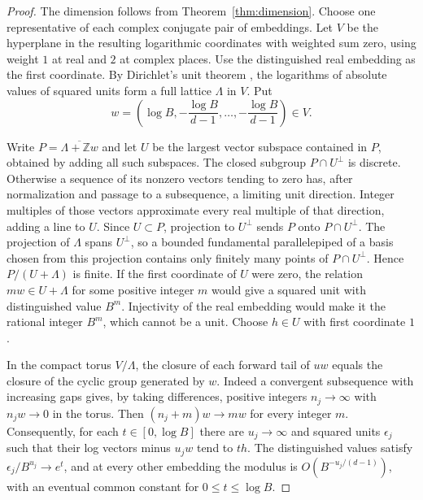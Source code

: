 \documentclass[11pt,reqno,a4paper]{amsart}
\theoremstyle{remark}
\begin{document}
\begin{proof}
The dimension follows from Theorem~\ref{thm:dimension}. Choose
one representative of each complex conjugate pair of embeddings.
Let \(V\) be the hyperplane in the resulting logarithmic
coordinates with weighted sum zero, using weight \(1\) at real
and \(2\) at complex places. Use the distinguished real embedding
as the first coordinate. By Dirichlet's unit theorem
\cite[Chapter~I, \S7]{met-neukirch}, the logarithms of absolute
values of squared units form a full lattice \(\Lambda\) in \(V\).
Put
\[
 w=\left(\log B,-\frac{\log B}{d-1},\ldots,
                  -\frac{\log B}{d-1}\right)\in V.
\]

Write \(P=\overline{\Lambda+\mathbb Zw}\) and let \(U\) be the
largest vector subspace contained in \(P\), obtained by adding all
such subspaces. The closed subgroup \(P\cap U^\perp\) is discrete.
Otherwise a sequence of its nonzero vectors tending to zero has,
after normalization and passage to a subsequence, a limiting unit
direction. Integer multiples of those vectors approximate every
real multiple of that direction, adding a line to \(U\). Since
\(U\subset P\), projection to \(U^\perp\) sends \(P\) onto
\(P\cap U^\perp\). The projection of \(\Lambda\) spans \(U^\perp\),
so a bounded fundamental parallelepiped of a basis chosen from
this projection contains only finitely many points of
\(P\cap U^\perp\). Hence \(P/(U+\Lambda)\) is finite. If the
first coordinate of \(U\) were zero, the relation \(mw\in
U+\Lambda\) for some positive integer \(m\) would give a squared
unit with distinguished value \(B^m\). Injectivity of the real
embedding would make it the rational integer \(B^m\), which
cannot be a unit. Choose \(h\in U\) with first coordinate \(1\).

In the compact torus \(V/\Lambda\), the closure of each forward
tail of \(u w\) equals the closure of the cyclic group generated by
\(w\). Indeed a convergent subsequence with increasing gaps gives,
by taking differences, positive integers \(n_j\to\infty\) with
\(n_j w\to0\) in the torus. Then \((n_j+m)w\to mw\) for every
integer \(m\). Consequently, for each \(t\in[0,\log B]\) there
are \(u_j\to\infty\) and squared units \(\epsilon_j\) such that
their log vectors minus \(u_jw\) tend to \(th\).
The distinguished values satisfy
\(\epsilon_j/B^{u_j}\to e^t\), and at every other embedding the
modulus is \(O(B^{-u_j/(d-1)})\), with an eventual common constant
for \(0\leq t\leq\log B\).


\end{proof}
\end{document}
